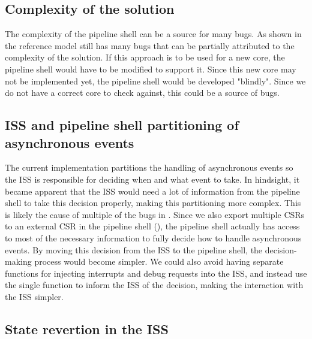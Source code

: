 \subsection{Complexity of the solution}


The complexity of the pipeline shell can be a source for many bugs. As shown in  the reference model still has many bugs that can be partially attributed to the complexity of the solution. If this approach is to be used for a new core, the pipeline shell would have to be modified to support it. Since this new core may not be implemented yet, the pipeline shell would be developed "blindly". Since we do not have a correct core to check against, this could be a source of bugs.

\subsection{ISS and pipeline shell partitioning of asynchronous events}
\label{sec:dis_async_partition}

The current implementation partitions the handling of asynchronous events so the ISS is responsible for deciding when and what event to take. In hindsight, it became apparent that the ISS would need a lot of information from the pipeline shell to take this decision properly, making this partitioning more complex. This is likely the cause of multiple of the bugs in . Since we also export multiple CSRs to an external CSR in the pipeline shell (), the pipeline shell actually has access to most of the necessary information to fully decide how to handle asynchronous events. By moving this decision from the ISS to the pipeline shell, the decision-making process would become simpler. We could also avoid having separate functions for injecting interrupts and debug requests into the ISS, and instead use the single  function to inform the ISS of the decision, making the interaction with the ISS simpler.

\subsection{State revertion in the ISS}

